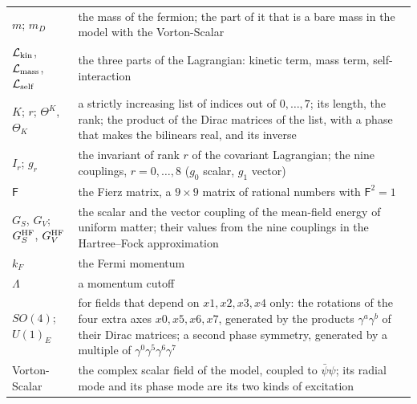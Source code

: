 \documentclass[
  10pt,
]{article}
\begin{document}
\begin{longtable}[]{@{}
  >{\raggedright\arraybackslash}p{}
  >{\raggedright\arraybackslash}p{}@{}}
\(m\); \(m_D\) & the mass of the fermion; the part of it that is a bare
mass in the model with the Vorton-Scalar \\
\(\mathcal L_{\rm kin}\), \(\mathcal L_{\rm mass}\),
\(\mathcal L_{\rm self}\) & the three parts of the Lagrangian: kinetic
term, mass term, self-interaction \\
\(K\); \(r\); \(\Theta^K\), \(\Theta_K\) & a strictly increasing list of
indices out of \(0,\dots,7\); its length, the rank; the product of the
Dirac matrices of the list, with a phase that makes the bilinears real,
and its inverse \\
\(I_r\); \(g_r\) & the invariant of rank \(r\) of the covariant
Lagrangian; the nine couplings, \(r=0,\dots,8\) (\(g_0\) scalar, \(g_1\)
vector) \\
\(\mathsf F\) & the Fierz matrix, a \(9\times9\) matrix of rational
numbers with \(\mathsf F^2=1\) \\
\(G_S\), \(G_V\); \(G_S^{\rm HF}\), \(G_V^{\rm HF}\) & the scalar and
the vector coupling of the mean-field energy of uniform matter; their
values from the nine couplings in the Hartree--Fock approximation \\
\(k_F\) & the Fermi momentum \\
\(\Lambda\) & a momentum cutoff \\
\(SO(4)\); \(U(1)_E\) & for fields that depend on \(x1,x2,x3,x4\) only:
the rotations of the four extra axes \(x0,x5,x6,x7\), generated by the
products \(\gamma^a\gamma^b\) of their Dirac matrices; a second phase
symmetry, generated by a multiple of
\(\gamma^0\gamma^5\gamma^6\gamma^7\) \\
Vorton-Scalar & the complex scalar field of the model, coupled to
\(\bar\psi\psi\); its radial mode and its phase mode are its two kinds
of excitation \\
\end{longtable}
\end{document}
